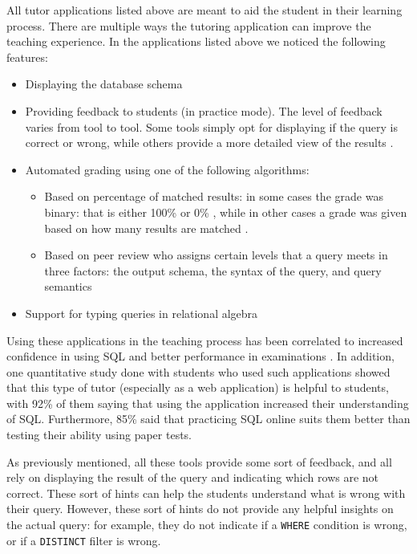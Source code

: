 All tutor applications listed above are meant to aid the student in their learning process. There are multiple ways the tutoring application can improve the teaching experience. In the applications listed above we noticed the following features:

\begin{itemize}
    \item Displaying the database schema
    \item Providing feedback to students (in practice mode). The level of feedback varies from tool to tool. Some tools simply opt for displaying if the query is correct or wrong, while others provide a more detailed view of the results \citep{literature:assesql, literature:activesql}.
    \item Automated grading using one of the following algorithms:
        \begin{itemize}
            \item Based on percentage of matched results: in some cases the grade was binary: that is either 100\% or 0\% \citep{literature:assesql}, while in other cases a grade was given based on how many results are matched \citep{literature:activesql}.
            \item Based on peer review who assigns certain levels that a query meets \citep{literature:sqlify} in three factors: the output schema, the syntax of the query, and query semantics
        \end{itemize}
    \item Support for typing queries in relational algebra
\end{itemize}

Using these applications in the teaching process has been correlated to increased confidence in using SQL \citep{literature:activesql} and better performance in examinations \citep{literature:sqlify}. In addition, one quantitative study done with students who used such applications \citep{literature:activesql} showed that this type of tutor (especially as a web application) is helpful to students, with 92\% of them saying that using the application increased their understanding of SQL. Furthermore, 85\% said that practicing SQL online suits them better than testing their ability using paper tests.

As previously mentioned, all these tools provide some sort of feedback, and all rely on displaying the result of the query and indicating which rows are not correct. These sort of hints can help the students understand what is wrong with their query. However, these sort of hints do not provide any helpful insights on the actual query: for example, they do not indicate if a \texttt{WHERE} condition is wrong, or if a \texttt{DISTINCT} filter is wrong.


